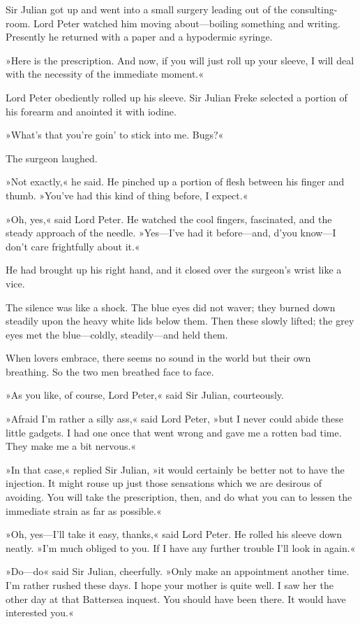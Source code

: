 Sir Julian got up and went into a small surgery leading out of the consulting-room. Lord Peter watched him moving about\allowbreak---\allowbreak boiling something and writing. Presently he returned with a paper and a hypodermic syringe.

»Here is the prescription. And now, if you will just roll up your sleeve, I will deal with the necessity of the immediate moment.«

Lord Peter obediently rolled up his sleeve. Sir Julian Freke selected a portion of his forearm and anointed it with iodine.

»What's that you're goin' to stick into me. Bugs?«

The surgeon laughed.

»Not exactly,« he said. He pinched up a portion of flesh between his finger and thumb. »You've had this kind of thing before, I expect.«

»Oh, yes,« said Lord Peter. He watched the cool fingers, fascinated, and the steady approach of the needle. »Yes\allowbreak---\allowbreak I've had it before\allowbreak---\allowbreak and, d'you know\allowbreak---\allowbreak I don't care frightfully about it.«

He had brought up his right hand, and it closed over the surgeon's wrist like a vice.

The silence was like a shock. The blue eyes did not waver; they burned down steadily upon the heavy white lids below them. Then these slowly lifted; the grey eyes met the blue\allowbreak---\allowbreak coldly, steadily\allowbreak---\allowbreak and held them.

When lovers embrace, there seems no sound in the world but their own breathing. So the two men breathed face to face.

»As you like, of course, Lord Peter,« said Sir Julian, courteously.

»Afraid I'm rather a silly ass,« said Lord Peter, »but I never could abide these little gadgets. I had one once that went wrong and gave me a rotten bad time. They make me a bit nervous.«

»In that case,« replied Sir Julian, »it would certainly be better not to have the injection. It might rouse up just those sensations which we are desirous of avoiding. You will take the prescription, then, and do what you can to lessen the immediate strain as far as possible.«

»Oh, yes\allowbreak---\allowbreak I'll take it easy, thanks,« said Lord Peter. He rolled his sleeve down neatly. »I'm much obliged to you. If I have any further trouble I'll look in again.«

»Do\allowbreak---\allowbreak do\longdash« said Sir Julian, cheerfully. »Only make an appointment another time. I'm rather rushed these days. I hope your mother is quite well. I saw her the other day at that Battersea inquest. You should have been there. It would have interested you.«